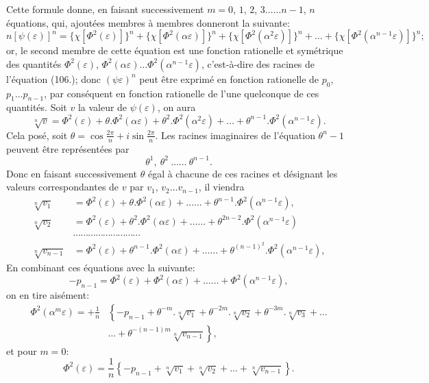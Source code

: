 \documentclass{article}
\begin{document}
Cette formule donne, en faisant successivement $m=0$, $1$, $2$, $3\ldots\ldots n-1$, $n$ équations, qui, ajoutées membres à membres donneront la suivante:
\[ n[\psi(\varepsilon)]^{n}=\{\chi[\Phi^{2}(\varepsilon)]\}^{n}+\{\chi[\Phi^{2}(\alpha\varepsilon)]\}^{n}+\{\chi[\Phi^{2}(\alpha^{2}\varepsilon)]\}^{n}+\ldots+\{\chi[\Phi^{2}(\alpha^{n-1}\varepsilon)]\}^{n}; \tag{112.} \]
or, le second membre de cette équation est une fonction rationelle et symétrique des quantités $\Phi^{2}(\varepsilon)$, $\Phi^{2}(\alpha\varepsilon)\ldots\Phi^{2}(\alpha^{n-1}\varepsilon)$, c'est-à-dire des racines de l'équation (106.); donc $(\psi\varepsilon)^{n}$ peut être exprimé en fonction rationelle de $p_{0}$, $p_{1}\ldots p_{n-1}$, par conséquent en fonction rationelle de l'une quelconque de ces quantités. Soit $v$ la valeur de $\psi(\varepsilon)$, on aura
\[ \sqrt[n]{v}=\Phi^{2}(\varepsilon)+\theta.\Phi^{2}(\alpha\varepsilon)+\theta^{2}.\Phi^{2}(\alpha^{2}\varepsilon)+\ldots+\theta^{n-1}.\Phi^{2}(\alpha^{n-1}\varepsilon). \tag{113.} \]
Cela posé, soit $\theta=\cos\frac{2\pi}{n}+i\sin\frac{2\pi}{n}$. Les racines imaginaires de l'équation $\theta^{n}-1$ peuvent être représentées par
\[ \theta^{1},\ \theta^{2}\ \ldots\ldots\ \theta^{n-1}. \]
Donc en faisant successivement $\theta$ égal à chacune de ces racines et désignant les valeurs correspondantes de $v$ par $v_{1}$, $v_{2}\ldots v_{n-1}$, il viendra
\[ \begin{aligned}
\sqrt[n]{v_{1}}&=\Phi^{2}(\varepsilon)+\theta.\Phi^{2}(\alpha\varepsilon)+\ldots\ldots+\theta^{n-1}.\Phi^{2}(\alpha^{n-1}\varepsilon),\\
\sqrt[n]{v_{2}}&=\Phi^{2}(\varepsilon)+\theta^{2}.\Phi^{2}(\alpha\varepsilon)+\ldots\ldots+\theta^{2n-2}.\Phi^{2}(\alpha^{n-1}\varepsilon)\\
&\cdots\cdots\cdots\cdots\cdots\cdots\cdots\cdots\cdots\\
\sqrt[n]{v_{n-1}}&=\Phi^{2}(\varepsilon)+\theta^{n-1}.\Phi^{2}(\alpha\varepsilon)+\ldots\ldots+\theta^{(n-1)^{2}}.\Phi^{2}(\alpha^{n-1}\varepsilon),
\end{aligned} \]
En combinant ces équations avec la suivante:
\[ -p_{n-1}=\Phi^{2}(\varepsilon)+\Phi^{2}(\alpha\varepsilon)+\ldots\ldots+\Phi^{2}(\alpha^{n-1}\varepsilon), \]
on en tire aisément:
\[ \begin{aligned}
\Phi^{2}(\alpha^{m}\varepsilon)=+\frac{1}{n}&\left\{-p_{n-1}+\theta^{-m}.\sqrt[n]{v_{1}}+\theta^{-2m}.\sqrt[n]{v_{2}}+\theta^{-3m}.\sqrt[n]{v_{3}}+\ldots\right.\\
&\left.\ldots+\theta^{-(n-1)m}\sqrt[n]{v_{n-1}}\right\},
\end{aligned} \tag{114.} \]
et pour $m=0$:
\[ \Phi^{2}(\varepsilon)=\frac{1}{n}\left\{-p_{n-1}+\sqrt[n]{v_{1}}+\sqrt[n]{v_{2}}+\ldots+\sqrt[n]{v_{n-1}}\right\}. \tag{115.} \]
\end{document}
